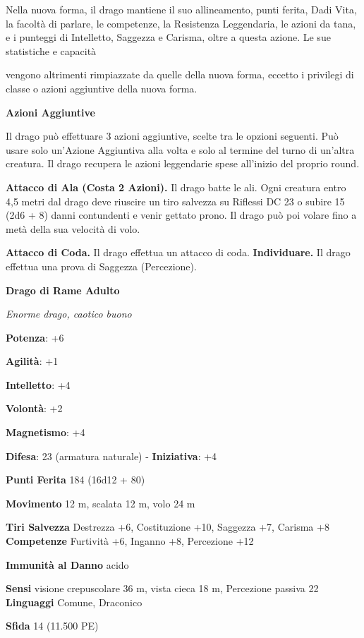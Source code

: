 \begin{multicols}{2}
Nella nuova forma, il drago mantiene il suo allineamento, punti ferita,
Dadi Vita, la facoltà di parlare, le competenze, la Resistenza
Leggendaria, le azioni da tana, e i punteggi di Intelletto, Saggezza e
Carisma, oltre a questa azione. Le sue statistiche e capacità

vengono altrimenti rimpiazzate da quelle della nuova forma, eccetto i
privilegi di classe o azioni aggiuntive della nuova forma.

\textbf{Azioni Aggiuntive}

Il drago può effettuare 3 azioni aggiuntive, scelte tra le opzioni
seguenti. Può usare solo un'Azione Aggiuntiva alla volta e solo al
termine del turno di un'altra creatura. Il drago recupera le azioni
leggendarie spese all'inizio del proprio round.

\textbf{Attacco di Ala (Costa 2 Azioni).} Il drago batte le ali. Ogni
creatura entro 4,5 metri dal drago deve riuscire un tiro salvezza su Riflessi DC 23 o subire 15 (2d6 + 8) danni contundenti e venir gettato
prono. Il drago può poi volare fino a metà della sua velocità di volo.

\textbf{Attacco di Coda.} Il drago effettua un attacco di coda.
\textbf{Individuare.} Il drago effettua una prova di Saggezza
(Percezione).



\textbf{Drago di Rame Adulto}

\emph{Enorme drago, caotico buono}

\textbf{Potenza}: +6

\textbf{Agilità}: +1

\textbf{Intelletto}: +4

\textbf{Volontà}: +2

\textbf{Magnetismo}: +4

\textbf{Difesa}: 23 (armatura naturale) - \textbf{Iniziativa}: +4

\textbf{Punti Ferita} 184 (16d12 + 80)

\textbf{Movimento} 12 m, scalata 12 m, volo 24 m

\textbf{Tiri Salvezza} Destrezza +6, Costituzione +10, Saggezza +7,
Carisma +8 \textbf{Competenze} Furtività +6, Inganno +8, Percezione +12

\textbf{Immunità al Danno} acido

\textbf{Sensi} visione crepuscolare 36 m, vista cieca 18 m, Percezione passiva
22 \textbf{Linguaggi} Comune, Draconico

\textbf{Sfida} 14 (11.500 PE)\smallskip


\end{multicols}

